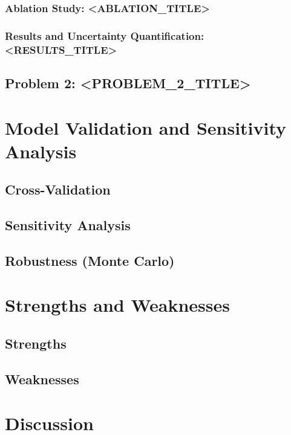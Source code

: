 \documentclass[12pt,letterpaper]{article}
\begin{document}
\subsubsection{Ablation Study: <ABLATION\_TITLE>}
\subsubsection{Results and Uncertainty Quantification: <RESULTS\_TITLE>}

\subsection{Problem 2: <PROBLEM\_2\_TITLE>}

\section{Model Validation and Sensitivity Analysis}
\subsection{Cross-Validation}
\subsection{Sensitivity Analysis}
\subsection{Robustness (Monte Carlo)}

\section{Strengths and Weaknesses}
\subsection{Strengths}
\subsection{Weaknesses}

\section{Discussion}
\end{document}
